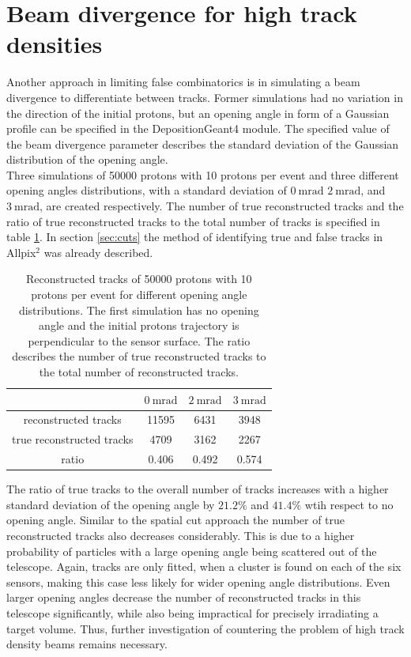 \section{Beam divergence for high track densities}
Another approach in limiting false combinatorics is in simulating a beam divergence to differentiate between tracks. Former simulations had no variation
in the direction of the initial protons, but an opening angle in form of a Gaussian profile can be specified in the DepositionGeant4 module. The specified value of
the beam divergence parameter describes the standard deviation of the Gaussian distribution of the opening angle.  \\
Three simulations of 50000 protons with 10 protons per event and three different opening angles distributions, with a standard deviation of $\SI{0}{\milli\radian}$
$\SI{2}{\milli\radian}$, and $\SI{3}{\milli\radian}$, are created respectively.
The number of true reconstructed tracks and the ratio
of true reconstructed tracks to the total number of tracks is specified in table \ref{tab:angle}. In section \ref{sec:cuts} the method of identifying
true and false tracks in Allpix$^2$ was already described.

\begin{table}
  \centering
  \begin{tabular}{c | c c c}
    \toprule
     &  $\SI{0}{\milli\radian}$ & $\SI{2}{\milli\radian}$ & $\SI{3}{\milli\radian}$\\
    \midrule
    reconstructed tracks & 11595 & 6431 & 3948  \\
    true reconstructed tracks & 4709 & 3162 & 2267 \\
    ratio & 0.406 & 0.492 & 0.574
  \end{tabular}
  \caption{Reconstructed tracks of 50000 protons with 10 protons per event for different opening angle
  distributions. The first simulation has no opening angle and the initial protons
  trajectory is perpendicular to the sensor surface.
  The ratio describes the number of true reconstructed tracks to the total number of reconstructed tracks.}
  \label{tab:angle}
\end{table}

The ratio of true tracks to the overall number of tracks increases with a higher standard deviation of the opening angle by $21.2\%$ and $41.4\%$ wtih respect to
no opening angle. Similar to the spatial cut approach the
number of true reconstructed tracks also decreases considerably. This is due to a higher probability of particles with a large opening angle being scattered out of the telescope.
Again, tracks are only fitted, when a cluster is found on each of the six sensors, making this case less likely for wider opening angle distributions.
Even larger opening angles decrease the number of reconstructed tracks in this telescope significantly, while also being impractical for precisely irradiating a target volume.
Thus, further investigation of countering the problem of high track density beams remains necessary.

